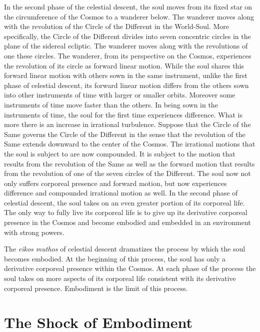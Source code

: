 In the second phase of the celestial descent, the soul moves from its fixed star on the circumference of the Cosmos to a wanderer below. The wanderer moves along with the revolution of the Circle of the Different in the World-Soul. More specifically, the Circle of the Different divides into seven concentric circles in the plane of the sidereal ecliptic. The wanderer moves along with the revolutions of one these circles. The wanderer, from its perspective on the Cosmos, experiences the revolution of its circle as forward linear motion. While the soul shares this forward linear motion with others sown in the same instrument, unlike the first phase of celestial descent, its forward linear motion differs from the others sown into other instruments of time with larger or smaller orbits. Moreover some instruments of time move faster than the others. In being sown in the instruments of time, the soul for the first time experiences difference. What is more there is an increase in irrational turbulence.  Suppose that the Circle of the Same governs the Circle of the Different in the sense that the revolution of the Same extends downward to the center of the Cosmos. The irrational motions that the soul is subject to are now compounded. It is subject to the motion that results from the revolution of the Same as well as the forward motion that results from the revolution of one of the seven circles of the Different. The soul now not only suffers corporeal presence and forward motion, but now experiences difference and compounded irrational motion as well. In the second phase of celestial descent, the soul takes on an even greater portion of its corporeal life. The only way to fully live its corporeal life is to give up its derivative corporeal presence in the Cosmos and become embodied and embedded in an environment with strong powers. 

The \emph{eikos muthos} of celestial descent dramatizes the process by which the soul becomes embodied. At the beginning of this process, the soul has only a derivative corporeal presence within the Cosmos. At each phase of the process the soul takes on more aspects of its corporeal life consistent with its derivative corporeal presence. Embodiment is the limit of this process.


\section{The Shock of Embodiment} %
\label{sec:the_shock_of_embodiment}

